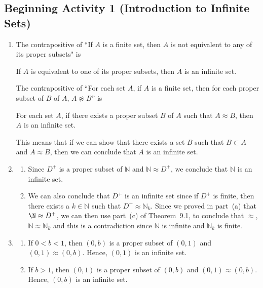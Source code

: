 \documentclass[11pt]{article}
\begin{document}
\subsection*{Beginning Activity 1 (Introduction to Infinite Sets)}
\begin{enumerate}
\item The contrapositive of ``If $A$ is a finite set, then $A$ is not equivalent to any of its proper subsets" is
\begin{center}
If $A$ is equivalent to one of its proper subsets, then $A$ is an infinite set.
\end{center}
The contrapositive of ``For each set $A$, if $A$ is a finite set, then for each proper subset of $B$ of $A$, $A \not\approx B$'' is
\begin{center}
For each set $A$, if there exists a proper subset $B$ of $A$ such that $A \approx B$, then $A$ is an infinite set.
\end{center}
 This means that if we can show that there exists a set $B$ such that $B \subset A$ and 
$A \approx B$, then we can conclude that $A$ is an infinite set.

\item \begin{enumerate}
\item Since $D^+$ is a proper subset of $\mathbb{N}$ and $\mathbb{N} \approx D^+$, we conclude that $\mathbb{N}$ is an infinite set.  

\item We can also conclude that $D^+$ is an infinite set since if $D^+$ is finite, then there exists a $k \in \mathbb{N}$ such that $D^+ \approx \mathbb{N}_k$.  Since we proved in part~(a) that $\N \approx D^+$, we can then use part~(c) of Theorem~9.1, to conclude that $\approx$, $\mathbb{N} \approx \mathbb{N}_k$ and this is a contradiction since $\mathbb{N}$ is infinite and $\mathbb{N}_k$ is finite.
\end{enumerate}

\item \begin{enumerate}
\item If $0 < b < 1$, then $\left( 0, b \right)$ is a proper subset of 
$\left( 0, 1 \right)$ and 
$\left( 0, 1 \right) \approx \left( 0, b \right)$.  Hence, $\left( 0, 1 \right)$ is an infinite set.

\item If $b > 1$, then $\left( 0, 1 \right)$ is a proper subset of $\left( 0, b \right)$ and 
$\left( 0, 1 \right) \approx \left( 0, b \right)$.  Hence, $\left( 0, b \right)$ is an infinite set.
\end{enumerate}
\end{enumerate}
\hbreak
\end{document}
